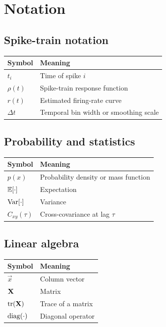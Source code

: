 \chapter*{Notation}

\section*{Spike-train notation}

\begin{tabular}{@{}ll@{}}
  \toprule
  \textbf{Symbol} & \textbf{Meaning} \\
  \midrule
  $t_i$ & Time of spike $i$ \\
  $\rho(t)$ & Spike-train response function \\
  $r(t)$ & Estimated firing-rate curve \\
  $\Delta t$ & Temporal bin width or smoothing scale \\
  \bottomrule
\end{tabular}

\section*{Probability and statistics}

\begin{tabular}{@{}ll@{}}
  \toprule
  \textbf{Symbol} & \textbf{Meaning} \\
  \midrule
  $p(x)$ & Probability density or mass function \\
  $\mathbb{E}[\cdot]$ & Expectation \\
  $\operatorname{Var}[\cdot]$ & Variance \\
  $C_{xy}(\tau)$ & Cross-covariance at lag $\tau$ \\
  \bottomrule
\end{tabular}

\section*{Linear algebra}

\begin{tabular}{@{}ll@{}}
  \toprule
  \textbf{Symbol} & \textbf{Meaning} \\
  \midrule
  $\vec{x}$ & Column vector \\
  $\mathbf{X}$ & Matrix \\
  $\operatorname{tr}(\mathbf{X})$ & Trace of a matrix \\
  $\operatorname{diag}(\cdot)$ & Diagonal operator \\
  \bottomrule
\end{tabular}
